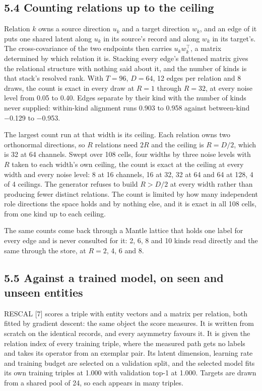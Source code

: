 \documentclass[10pt,letterpaper,twocolumn]{article}
\begin{document}
\subsection{5.4 Counting relations up to the ceiling}\label{54-counting-relations-up-to-the-ceiling}

Relation \(k\) owns a source direction \(u_k\) and a target direction \(w_k\), and an edge of it puts one
shared latent along \(u_k\) in its source's record and along \(w_k\) in its target's. The cross-covariance
of the two endpoints then carries \(u_k w_k^\top\), a matrix determined by which relation it is.
Stacking every edge's flattened matrix gives the relational structure with nothing said about it,
and the number of kinds is that stack's resolved rank. With \(T = 96\), \(D = 64\), 12 edges per
relation and 8 draws, the count is exact in every draw at \(R = 1\) through \(R = 32\), at every noise
level from 0.05 to 0.40. Edges separate by their kind with the number of kinds never supplied:
within-kind alignment runs 0.903 to 0.958 against between-kind −0.129 to −0.953.

The largest count run at that width is its ceiling. Each relation owns two orthonormal directions, so
\(R\) relations need \(2R\) and the ceiling is \(R = D/2\), which is 32 at 64 channels. Swept over 108
cells, four widths by three noise levels with \(R\) taken to each width's own ceiling, the count is
exact at the ceiling at every width and every noise level: 8 at 16 channels, 16 at 32, 32 at 64 and 64
at 128, 4 of 4 ceilings. The generator refuses to build \(R > D/2\) at every width rather than producing
fewer distinct relations. The count is limited by how many independent role directions the space
holds and by nothing else, and it is exact in all 108 cells, from one kind up to each ceiling.

The same counts come back through a Mantle lattice that holds one label for every edge and is never
consulted for it: 2, 6, 8 and 10 kinds read directly and the same through the store, at \(R = 2\), 4,
6 and 8.

\subsection{5.5 Against a trained model, on seen and unseen entities}\label{55-against-a-trained-model-on-seen-and-unseen-entities}

RESCAL {[}7{]} scores a triple with entity vectors and a matrix per relation, both fitted by gradient
descent: the same object the score measures. It is written from scratch on the
identical records, and every asymmetry favours it. It is given the relation index of every training
triple, where the measured path gets no labels and takes its operator from an exemplar pair. Its
latent dimension, learning rate and training budget are selected on a validation split, and the
selected model fits its own training triples at 1.000 with validation top-1 at 1.000. Targets are
drawn from a shared pool of 24, so each appears in many triples.
\end{document}
